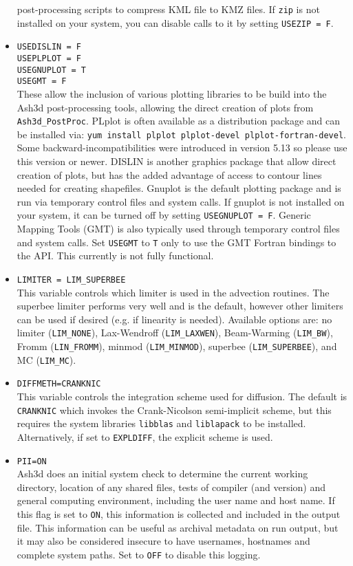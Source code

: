 \begin{itemize}
post-processing scripts to compress KML file to KMZ files.
If \texttt{zip} is not
installed on your system, you can disable calls to it by setting \texttt{USEZIP = F}.
 \item \texttt{USEDISLIN = F}\\
 \texttt{USEPLPLOT = F}\\
 \texttt{USEGNUPLOT = T}\\
 \texttt{USEGMT = F}\\
 These allow the inclusion of various plotting libraries to be build into the Ash3d
post-processing tools, allowing the direct creation of plots from \texttt{Ash3d\_PostProc}.
PLplot is often available as a distribution package and can be installed via:
\texttt{yum install plplot plplot-devel plplot-fortran-devel}. Some backward-incompatibilities
were introduced in version 5.13 so please use this version or newer. DISLIN is another
graphics package that allow direct creation of plots, but has the added advantage of
access to contour lines needed for creating shapefiles. Gnuplot is the default plotting
package and is run via temporary control files and system calls. If gnuplot is not installed
on your system, it can be turned off by setting \texttt{USEGNUPLOT = F}.
Generic Mapping Tools (GMT)
is also typically used through temporary control files and system calls.  Set \texttt{USEGMT}
to \texttt{T} only to use the GMT Fortran bindings to the API. This currently is not
fully functional.
 \item \texttt{LIMITER = LIM\_SUPERBEE}\\
This variable controls which limiter is used in the advection routines.  The
superbee limiter performs very well and is the default, however other limiters
can be used if desired (e.g. if linearity is needed).  Available options are:
no limiter (\texttt{LIM\_NONE}), Lax-Wendroff (\texttt{LIM\_LAXWEN}),
Beam-Warming (\texttt{LIM\_BW}), Fromm (\texttt{LIN\_FROMM}), 
minmod (\texttt{LIM\_MINMOD}), superbee (\texttt{LIM\_SUPERBEE}),
and MC (\texttt{LIM\_MC}).
 \item \texttt{DIFFMETH=CRANKNIC}\\
This variable controls the integration scheme used for diffusion.  The default
is \texttt{CRANKNIC} which invokes the Crank-Nicolson semi-implicit scheme, but
this requires the  system libraries \texttt{libblas} and \texttt{liblapack} to be installed.
Alternatively, if set to \texttt{EXPLDIFF}, the explicit scheme is used.
 \item \texttt{PII=ON}\\
Ash3d does an initial system check to determine the current working directory, location
of any shared files, tests of compiler (and version) and general computing
environment, including the user name and host name. If this flag is set to \texttt{ON}, this
information is collected and included in the output file.  This information
can be useful as archival metadata on run output, but it may also be considered insecure
to have usernames, hostnames and complete system paths. Set to \texttt{OFF} to
disable this logging.
\end{itemize}

